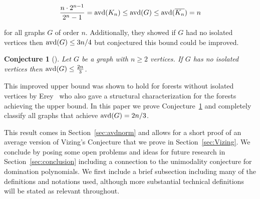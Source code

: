 \documentclass[11pt]{article}
\newtheorem{conjecture}[definition]{Conjecture}
\newcommand{\avd}{\text{\rm{avd}}}
\begin{document}
$$\frac{n\cdot 2^{n-1}}{2^n-1}=\avd(K_n)\le \avd(G)\le \avd(\overline{K_n})=n $$

\noindent for all graphs $G$ of order $n$. Additionally, they showed if $G$ had no isolated vertices then $\avd(G) \le 3n/4$ but conjectured this bound could be improved.

\begin{conjecture}[\cite{2021Beaton}]
\label{conj:2n/3}
 Let $G$ be a graph with $n \geq 2$ vertices. If $G$ has no isolated vertices then $\avd(G) \leq \frac{2n}{3}$.
\end{conjecture}

\noindent This improved upper bound was shown to hold for forests without isolated vertices by Erey~\cite{2021Erey} who also gave a structural characterization for the forests achieving the upper bound. %
In this paper we prove Conjecture~\ref{conj:2n/3} and completely classify all graphs that achieve $\avd(G)=2n/3$.

This result comes in Section~\ref{sec:avdnorm} and allows for a short proof of an average version of Vizing's Conjecture that we prove in Section~\ref{sec:Vizing}. We conclude by posing some open problems and ideas for future research in Section~\ref{sec:conclusion} including a connection to the unimodality conjecture for domination polynomials. We first include a brief subsection including many of the definitions and notations used, although more substantial technical definitions will be stated as relevant throughout.
\end{document}
